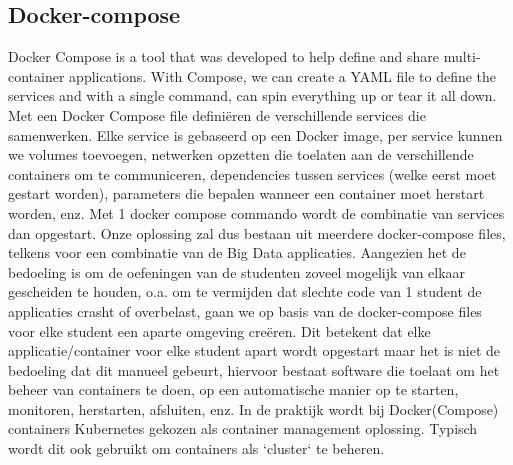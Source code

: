 \subsection{Docker-compose}
Docker Compose is a tool that was developed to help define and share multi-container applications. With Compose, we can create a YAML file to define the services and with a single command, can spin everything up or tear it all down. \autocite{Docker2023}
\newline
\newline
Met een Docker Compose file definiëren de verschillende services die samenwerken. Elke service is gebaseerd op een Docker image, per service kunnen we volumes toevoegen, netwerken opzetten die toelaten aan de verschillende containers om te communiceren, dependencies tussen services (welke eerst moet gestart worden), parameters die bepalen wanneer een container moet herstart worden, enz. 
\newline
\newline
Met 1 docker compose commando wordt de combinatie van services dan opgestart.
\newline
\newline
Onze oplossing zal dus bestaan uit meerdere docker-compose files, telkens voor een combinatie van de Big Data applicaties.
\newline
\newline
Aangezien het de bedoeling is om de oefeningen van de studenten zoveel mogelijk van elkaar gescheiden te houden, o.a. om te vermijden dat slechte code van 1 student de applicaties crasht of overbelast, gaan we op basis van de docker-compose files voor elke student een aparte omgeving creëren. Dit betekent dat elke applicatie/container voor elke student apart wordt opgestart maar het is niet de bedoeling dat dit manueel gebeurt, hiervoor bestaat software die toelaat om het beheer van containers te doen, op een automatische manier op te starten, monitoren, herstarten, afsluiten, enz.
In de praktijk wordt bij Docker(Compose) containers Kubernetes gekozen als container management oplossing. Typisch wordt dit ook gebruikt om containers als `cluster` te beheren.

